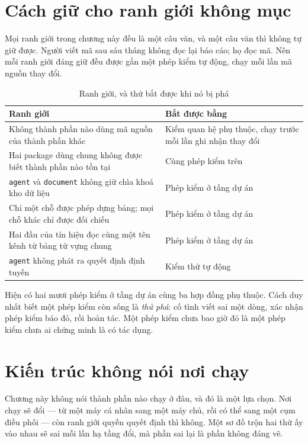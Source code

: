 \section{Cách giữ cho ranh giới không mục}
\label{sec:giu-ranh-gioi}

Mọi ranh giới trong chương này đều là một câu văn, và một câu văn thì không tự giữ được. Người
viết mã sau sáu tháng không đọc lại báo cáo; họ đọc mã. Nên mỗi ranh giới đáng giữ đều được gắn
một phép kiểm tự động, chạy mỗi lần mã nguồn thay đổi.

\begin{table}[htbp]
\centering
\caption{Ranh giới, và thứ bắt được khi nó bị phá}
\label{tab:giu-ranh-gioi}
\begin{tabular}{@{}L{7.4cm}L{6.4cm}@{}}
\toprule
\textbf{Ranh giới} & \textbf{Bắt được bằng} \\
\midrule
Không thành phần nào dùng mã nguồn của thành phần khác & Kiểm quan hệ phụ thuộc, chạy trước mỗi lần ghi nhận thay đổi \\
\addlinespace
Hai package dùng chung không được biết thành phần nào tồn tại & Cùng phép kiểm trên \\
\addlinespace
\texttt{agent} và \texttt{document} không giữ chìa khoá kho dữ liệu & Phép kiểm ở tầng dự án \\
\addlinespace
Chỉ một chỗ được phép dựng bảng; mọi chỗ khác chỉ được đối chiếu & Phép kiểm ở tầng dự án \\
\addlinespace
Hai đầu của tín hiệu đọc cùng một tên kênh từ bảng từ vựng chung & Phép kiểm ở tầng dự án \\
\addlinespace
\texttt{agent} không phát ra quyết định định tuyến & Kiểm thử tự động \\
\bottomrule
\end{tabular}
\end{table}

Hiện có hai mươi phép kiểm ở tầng dự án cùng ba hợp đồng phụ thuộc. Cách duy nhất biết một phép
kiểm còn sống là \emph{thử phá}: cố tình viết sai một dòng, xác nhận phép kiểm báo đỏ, rồi hoàn
tác. Một phép kiểm chưa bao giờ đỏ là một phép kiểm chưa ai chứng minh là có tác dụng.

\section{Kiến trúc không nói nơi chạy}

Chương này không nói thành phần nào chạy ở đâu, và đó là một lựa chọn. Nơi chạy sẽ đổi --- từ
một máy cá nhân sang một máy chủ, rồi có thể sang một cụm điều phối --- còn ranh giới quyền
quyết định thì không. Một sơ đồ trộn hai thứ ấy vào nhau sẽ sai mỗi lần hạ tầng đổi, mà phần
sai lại là phần không đáng vẽ.

